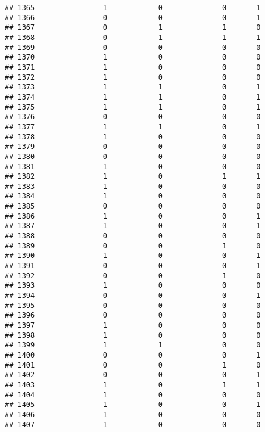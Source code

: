 \documentclass[]{article}
\begin{document}
\begin{verbatim}
## 1365                1            0              0       1
## 1366                0            0              0       1
## 1367                0            1              1       0
## 1368                0            1              1       1
## 1369                0            0              0       0
## 1370                1            0              0       0
## 1371                1            0              0       0
## 1372                1            0              0       0
## 1373                1            1              0       1
## 1374                1            1              0       1
## 1375                1            1              0       1
## 1376                0            0              0       0
## 1377                1            1              0       1
## 1378                1            0              0       0
## 1379                0            0              0       0
## 1380                0            0              0       0
## 1381                1            0              0       0
## 1382                1            0              1       1
## 1383                1            0              0       0
## 1384                1            0              0       0
## 1385                0            0              0       0
## 1386                1            0              0       1
## 1387                1            0              0       1
## 1388                0            0              0       0
## 1389                0            0              1       0
## 1390                1            0              0       1
## 1391                0            0              0       1
## 1392                0            0              1       0
## 1393                1            0              0       0
## 1394                0            0              0       1
## 1395                0            0              0       0
## 1396                0            0              0       0
## 1397                1            0              0       0
## 1398                1            0              0       0
## 1399                1            1              0       0
## 1400                0            0              0       1
## 1401                0            0              1       0
## 1402                0            0              0       1
## 1403                1            0              1       1
## 1404                1            0              0       0
## 1405                1            0              0       1
## 1406                1            0              0       0
## 1407                1            0              0       0

\end{verbatim}
\end{document}
